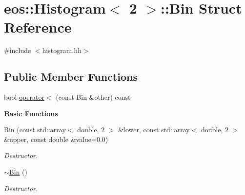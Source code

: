 \hypertarget{structeos_1_1Histogram_3_012_01_4_1_1Bin}{
\section{eos::Histogram$<$ 2 $>$::Bin Struct Reference}
\label{structeos_1_1Histogram_3_012_01_4_1_1Bin}
}


{\ttfamily \#include $<$histogram.hh$>$}\subsection*{Public Member Functions}
\begin{DoxyCompactItemize}
\item 
bool \hyperlink{structeos_1_1Histogram_3_012_01_4_1_1Bin_a5f5d9d357e94ce75149ac710b954bb44}{operator$<$} (const Bin \&other) const 
\end{DoxyCompactItemize}
\begin{Indent}{\bf Basic Functions}\par
{\em \label{_amgrp2386c9a1f1785edee33f374dd2db9b3d}
 }\begin{DoxyCompactItemize}
\item 
\hyperlink{structeos_1_1Histogram_3_012_01_4_1_1Bin_ad3b75a64e6a8499a4abddaad4943aeac}{Bin} (const std::array$<$ double, 2 $>$ \&lower, const std::array$<$ double, 2 $>$ \&upper, const double \&value=0.0)
\begin{DoxyCompactList}\small\item\em Destructor. \item\end{DoxyCompactList}\item 
\hyperlink{structeos_1_1Histogram_3_012_01_4_1_1Bin_a945e453f3b5aa775c74122b2a5c8c983}{$\sim$Bin} ()
\begin{DoxyCompactList}\small\item\em Destructor. \item\end{DoxyCompactList}\end{DoxyCompactItemize}
\end{Indent}
